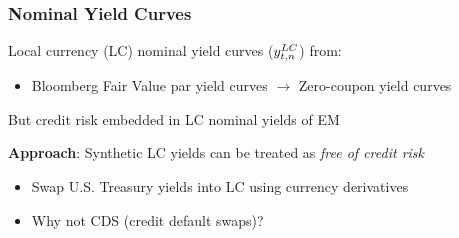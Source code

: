 \documentclass[12pt, aspectratio=169, xcolor=dvipsnames]{beamer}
\begin{document}
\begin{frame}
\frametitle{\alert{Nominal} Yield Curves}

	Local currency (LC) nominal yield curves (\(y_{t,n} ^{LC}\)) from:
	\begin{itemize}
		\item Bloomberg Fair Value par yield curves \(\rightarrow\) Zero-coupon yield curves
	\end{itemize}
	
	But \alert{credit risk} embedded in LC nominal yields of \alert{EM} %
	
	\textbf{Approach}: Synthetic LC yields can be treated as \textit{free of credit risk}
	\begin{itemize}
		\item Swap U.S. Treasury yields into LC using currency derivatives
		\item Why not CDS (credit default swaps)?
	\end{itemize}
\end{frame}
\end{document}

